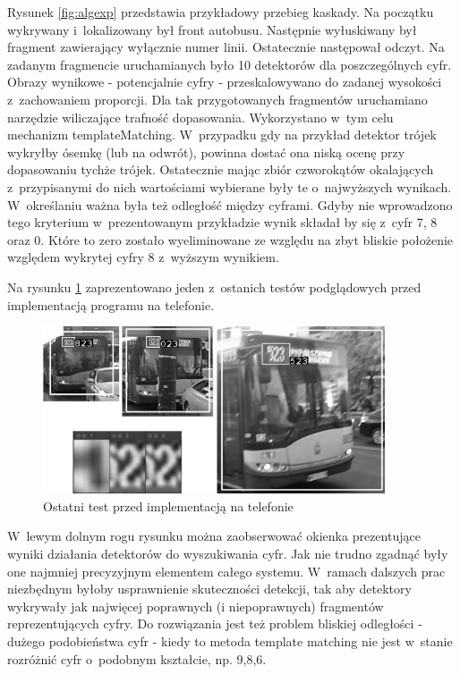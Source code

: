 Rysunek \ref{fig:algexp} przedstawia przykładowy przebieg kaskady. 
Na początku wykrywany i~lokalizowany był front autobusu.
Następnie wyłuskiwany był fragment zawierający wyłącznie numer linii.
Ostatecznie następował odczyt. Na zadanym fragmencie uruchamianych było
10 detektorów dla poszczególnych cyfr. Obrazy wynikowe - potencjalnie
cyfry - przeskalowywano do zadanej wysokości z~zachowaniem proporcji.
Dla tak przygotowanych fragmentów uruchamiano narzędzie wiliczające
trafność dopasowania. Wykorzystano w~tym celu
mechanizm templateMatching. W~przypadku
gdy na przykład detektor trójek
wykryłby ósemkę (lub na odwrót), powinna dostać ona niską
ocenę przy dopasowaniu tychże trójek. Ostatecznie mając
zbiór czworokątów okalających z~przypisanymi do nich wartościami
wybierane były te o~najwyższych wynikach. W~określaniu ważna była też
odległość między cyframi. Gdyby nie wprowadzono tego kryterium
w~prezentowanym przykładzie wynik składał by się z~cyfr 7, 8 oraz 0.
Które to zero zostało wyeliminowane ze względu na zbyt bliskie położenie
względem wykrytej cyfry 8 z~wyższym wynikiem.

Na rysunku \ref{fig:finaltest} zaprezentowano jeden z~ostanich 
testów podglądowych przed implementacją programu na telefonie.

\begin{figure}[!h]
	\centering
	\includegraphics[width=0.9\textwidth]{img/exp_final_test}
	\caption{Ostatni test przed implementacją na telefonie}
	\label{fig:finaltest}
\end{figure}

W~lewym dolnym rogu rysunku można zaobserwować okienka prezentujące
wyniki działania detektorów do wyszukiwania cyfr. Jak nie trudno
zgadnąć były one najmniej precyzyjnym elementem całego systemu.
W~ramach dalszych prac niezbędnym byłoby usprawnienie
skuteczności detekcji, tak aby detektory wykrywały jak 
najwięcej poprawnych (i niepoprawnych) fragmentów
reprezentujących cyfry. Do rozwiązania jest też problem
bliskiej odległości - dużego podobieństwa cyfr - kiedy to
metoda template matching nie jest w~stanie rozróżnić cyfr o~podobnym
kształcie, np. 9,8,6.

